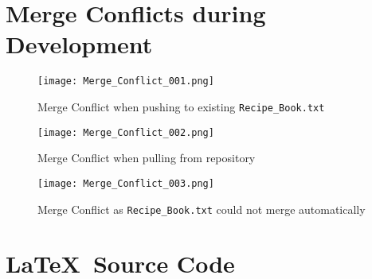 \documentclass[a4paper,twoside,12pt]{article}
\begin{document}
\pagebreak[4]
\section{Merge Conflicts during Development}
\begin{figure}[ht!]
	\centering
	\texttt{[image: Merge\_Conflict\_001.png]}
	\caption{Merge Conflict when pushing to existing \texttt{Recipe\_Book.txt}}
\end{figure}
\begin{figure}[ht!]
	\centering
	\texttt{[image: Merge\_Conflict\_002.png]}
	\caption{Merge Conflict when pulling from repository}
\end{figure}
\begin{figure}[ht!]
	\centering
	\texttt{[image: Merge\_Conflict\_003.png]}
	\caption{Merge Conflict as \texttt{Recipe\_Book.txt} could not merge automatically}
\end{figure}

\pagebreak[4]
\section{\LaTeX\ Source Code}
\end{document}
